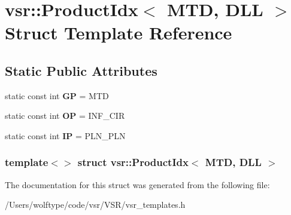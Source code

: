 \hypertarget{structvsr_1_1_product_idx_3_01_m_t_d_00_01_d_l_l_01_4}{\section{vsr\-:\-:Product\-Idx$<$ M\-T\-D, D\-L\-L $>$ Struct Template Reference}
\label{structvsr_1_1_product_idx_3_01_m_t_d_00_01_d_l_l_01_4}
}
\subsection*{Static Public Attributes}
\begin{DoxyCompactItemize}
\item 
\hypertarget{structvsr_1_1_product_idx_3_01_m_t_d_00_01_d_l_l_01_4_a66af979aeaa373feb673f58d8c167fc6}{static const int {\bfseries G\-P} = M\-T\-D}\label{structvsr_1_1_product_idx_3_01_m_t_d_00_01_d_l_l_01_4_a66af979aeaa373feb673f58d8c167fc6}

\item 
\hypertarget{structvsr_1_1_product_idx_3_01_m_t_d_00_01_d_l_l_01_4_a620d41a440036c49e8fe76cc70ce73fe}{static const int {\bfseries O\-P} = I\-N\-F\-\_\-\-C\-I\-R}\label{structvsr_1_1_product_idx_3_01_m_t_d_00_01_d_l_l_01_4_a620d41a440036c49e8fe76cc70ce73fe}

\item 
\hypertarget{structvsr_1_1_product_idx_3_01_m_t_d_00_01_d_l_l_01_4_a075b62b31d29f0dff92b087e2699148f}{static const int {\bfseries I\-P} = P\-L\-N\-\_\-\-P\-L\-N}\label{structvsr_1_1_product_idx_3_01_m_t_d_00_01_d_l_l_01_4_a075b62b31d29f0dff92b087e2699148f}

\end{DoxyCompactItemize}
\subsubsection*{template$<$$>$ struct vsr\-::\-Product\-Idx$<$ M\-T\-D, D\-L\-L $>$}



The documentation for this struct was generated from the following file\-:\begin{DoxyCompactItemize}
\item 
/\-Users/wolftype/code/vsr/\-V\-S\-R/vsr\-\_\-templates.\-h\end{DoxyCompactItemize}
